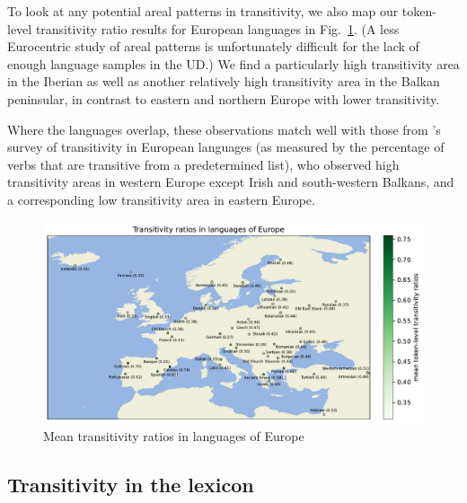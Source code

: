 To look at any potential areal patterns in transitivity, we also map our token-level transitivity ratio results for European languages in Fig.~\ref{fig:transitivity_europe}. (A less Eurocentric study of areal patterns is unfortunately difficult for the lack of enough language samples in the UD.) We find a particularly high transitivity area in the Iberian as well as another relatively high transitivity area in the Balkan peninsular, in contrast to eastern and northern Europe with lower transitivity.

Where the languages overlap, these observations match well with those from \citet{say2014}'s survey of transitivity in European languages (as measured by the percentage of verbs that are transitive from a predetermined list), who observed high transitivity areas in western Europe except Irish and south-western Balkans, and a corresponding low transitivity area in eastern Europe.

\begin{figure}
  \centering
  \includegraphics[width=\textwidth]{figures/transitivity_europe.pdf}
  \caption{Mean transitivity ratios in languages of Europe}
  \label{fig:transitivity_europe}
\end{figure}


\subsection{Transitivity in the lexicon}




